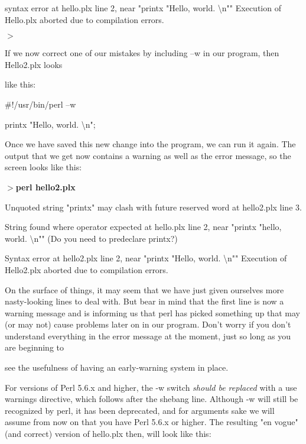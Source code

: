 \documentclass[a4paper,11pt]{book}
\begin{document}
\noindent syntax error at hello.plx line 2, near "printx "Hello, world. \textbackslash n"" Execution of Hello.plx aborted due to compilation errors.

\noindent $>$

\noindent 

\noindent 

\noindent If we now  correct  one of our mistakes  by  including  --w in our program,  then  Hello2.plx looks

\noindent like this:

\noindent 

\noindent \#!/usr/bin/perl --w

\noindent 

\noindent printx "Hello, world. \textbackslash n";

\noindent 

\noindent Once we have saved this new change into the program, we can run it again. The output that we get now contains a warning as well as the error message, so the screen looks like this:

\noindent 

\noindent \textbf{$>$perl hello2.plx}

\noindent 

\noindent Unquoted string "printx" may clash with future reserved word at hello2.plx line 3.

\noindent String found where operator expected at hello.plx line 2, near "printx "hello, world. \textbackslash n"" (Do you need to predeclare printx?)

\noindent Syntax error at hello2.plx line 2, near "printx "Hello, world. \textbackslash n"" Execution of Hello2.plx aborted due to compilation errors.

\noindent 

\noindent On the surface of things, it may seem that we have just given ourselves more nasty-looking lines to deal with. But bear in mind that the first line is now a warning  message and is informing us that perl has picked something up that may (or may not) cause problems later on in our program. Don't worry if you don't understand everything in the error message at the moment, just so long as you are beginning to

\noindent see the usefulness of having an early-warning system in place.

\noindent 

\noindent For versions of Perl 5.6.x and higher, the -w switch \textit{should be replaced }with a use warnings directive, which follows after the shebang line. Although -w will still be recognized by perl, it has been deprecated, and for arguments sake we will assume from now on that you have Perl 5.6.x or higher. The resulting "en vogue" (and correct) version of hello.plx then, will look like this:
\end{document}
